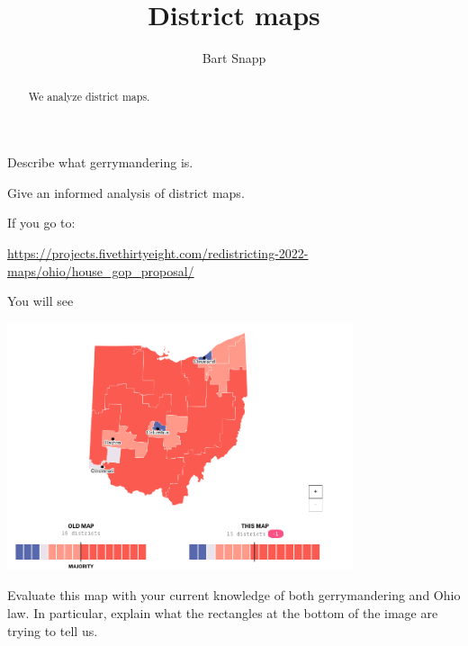 \documentclass[noauthor,nooutcomes,hints,handout]{ximera}
\title{District maps}
\author{Bart Snapp}
\begin{document}
\begin{abstract}
  We analyze district maps.
\end{abstract}
\maketitle

\begin{listOutcomes}
\item Describe what gerrymandering is.
\item Give an informed analysis of district maps.
\end{listOutcomes}




\mynewpage






\begin{question}
    If you go to:
  \begin{center}
  \url{https://projects.fivethirtyeight.com/redistricting-2022-maps/ohio/house_gop_proposal/}
  \end{center}
  You will see
  \begin{center}
    \includegraphics[width=4in]{houseGOP.png}
  \end{center}
  Evaluate this map with your current knowledge of both gerrymandering
  and Ohio law. In particular, explain what the rectangles at the
  bottom of the image are trying to tell us.
\end{question}


\mynewpage
\end{document}
